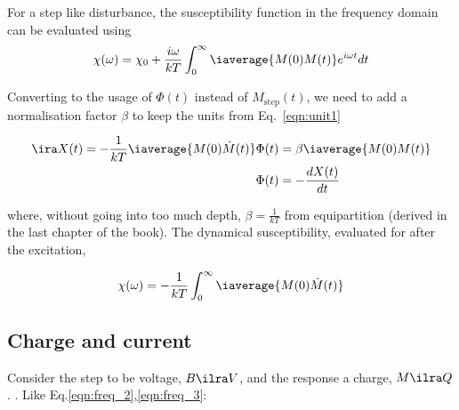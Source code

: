 \begin{framed}\noindent
  For  a step  like  disturbance, the  susceptibility  function in  the
  frequency domain can be evaluated using
  \begin{equation}\label{eqn:susceptibility_from_response}
    \chi(\omega) = \chi_0 + \frac{i\omega}{kT}\int_{0}^\infty\iaverage{M(0)M(t)}e^{i\omega t}dt
  \end{equation}

\end{framed}

\noindent   Converting  to   the  usage   of  $   \Phi(t)  $   instead  of
$ M_\text{step}(t) $,  we need to add  a normalisation factor $  \beta $ to
keep the units from Eq.~\eqref{eqn:unit1}

\begin{equation}\label{key}
  \begin{aligned} \ira X(t) = -\frac{1}{kT}\iaverage{M(0)\dot{M}(t)}
    \Phi(t) &= \beta\iaverage{M(0)M(t)}\\
    \Phi(t) &= -\frac{dX(t)}{dt}
  \end{aligned}
\end{equation}

\noindent    where,    without    going   into    too    much    depth,
$ \beta = \frac{1}{kT} $ from equipartition (derived in the last chapter of
the  book).   The dynamical  susceptibility,  evaluated  for after  the
excitation,

\begin{framed}\noindent
  \begin{equation}\label{eqn:onsager_1}
    \chi(\omega) =
    -\frac{1}{kT}\int_{0}^{\infty}\iaverage{M(0)\dot{M}(t)} %
  \end{equation}

\end{framed}

 \subsection{Charge and current}
 Consider the  step to be voltage,  $ B \ilra  V $, and the  response a
 charge, $  M \ilra Q $.   \textbf{}.
 Like Eq.\eqref{eqn:freq_2},\eqref{eqn:freq_3}:

